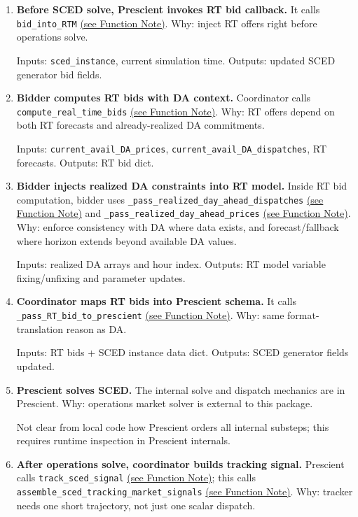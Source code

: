\documentclass{article}
\begin{document}
\begin{enumerate}[leftmargin=*]
  \item \textbf{Before SCED solve, Prescient invokes RT bid callback.} It calls \texttt{bid\_into\_RTM} \hyperref[fn:bid_into_RTM]{(see Function Note)}. Why: inject RT offers right before operations solve.

  Inputs: \texttt{sced\_instance}, current simulation time. Outputs: updated SCED generator bid fields.

  \item \textbf{Bidder computes RT bids with DA context.} Coordinator calls \texttt{compute\_real\_time\_bids} \hyperref[fn:compute_real_time_bids]{(see Function Note)}. Why: RT offers depend on both RT forecasts and already-realized DA commitments.

  Inputs: \texttt{current\_avail\_DA\_prices}, \texttt{current\_avail\_DA\_dispatches}, RT forecasts. Outputs: RT bid dict.

  \item \textbf{Bidder injects realized DA constraints into RT model.} Inside RT bid computation, bidder uses \texttt{\_pass\_realized\_day\_ahead\_dispatches} \hyperref[fn:pass_realized_day_ahead_dispatches]{(see Function Note)} and \texttt{\_pass\_realized\_day\_ahead\_prices} \hyperref[fn:pass_realized_day_ahead_prices]{(see Function Note)}. Why: enforce consistency with DA where data exists, and forecast/fallback where horizon extends beyond available DA values.

  Inputs: realized DA arrays and hour index. Outputs: RT model variable fixing/unfixing and parameter updates.

  \item \textbf{Coordinator maps RT bids into Prescient schema.} It calls \texttt{\_pass\_RT\_bid\_to\_prescient} \hyperref[fn:pass_RT_bid_to_prescient]{(see Function Note)}. Why: same format-translation reason as DA.

  Inputs: RT bids + SCED instance data dict. Outputs: SCED generator fields updated.

  \item \textbf{Prescient solves SCED.} The internal solve and dispatch mechanics are in Prescient. Why: operations market solver is external to this package.

  Not clear from local code how Prescient orders all internal substeps; this requires runtime inspection in Prescient internals.

  \item \textbf{After operations solve, coordinator builds tracking signal.} Prescient calls \texttt{track\_sced\_signal} \hyperref[fn:track_sced_signal]{(see Function Note)}; this calls \texttt{assemble\_sced\_tracking\_market\_signals} \hyperref[fn:assemble_sced_tracking_market_signals]{(see Function Note)}. Why: tracker needs one short trajectory, not just one scalar dispatch.


\end{enumerate}
\end{document}
